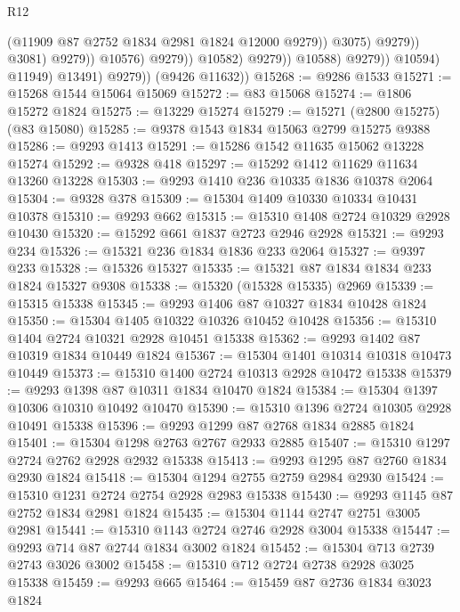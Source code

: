 \begin{lexlean}{R12}
\begin{coremodule}
                                                (@11909 @87 @2752 @1834 @2981 @1824 @12000 @9279))
                                              @3075)
                                            @9279))
                                        @3081)
                                      @9279))
                                  @10576)
                                @9279))
                            @10582)
                          @9279))
                      @10588)
                    @9279))
                @10594)
              @11949)
            @13491)
          @9279))
      (@9426 @11632))
@15268 := @9286 @1533
@15271 := @15268 @1544 @15064 @15069
@15272 := @83 @15068
@15274 := @1806 @15272 @1824
@15275 := @13229 @15274
@15279 := @15271 (@2800 @15275) (@83 @15080)
@15285 := @9378 @1543 @1834 @15063 @2799 @15275 @9388
@15286 := @9293 @1413
@15291 := @15286 @1542 @11635 @15062 @13228 @15274
@15292 := @9328 @418
@15297 := @15292 @1412 @11629 @11634 @13260 @13228
@15303 := @9293 @1410 @236 @10335 @1836 @10378 @2064
@15304 := @9328 @378
@15309 := @15304 @1409 @10330 @10334 @10431 @10378
@15310 := @9293 @662
@15315 := @15310 @1408 @2724 @10329 @2928 @10430
@15320 := @15292 @661 @1837 @2723 @2946 @2928
@15321 := @9293 @234
@15326 := @15321 @236 @1834 @1836 @233 @2064
@15327 := @9397 @233
@15328 := @15326 @15327
@15335 := @15321 @87 @1834 @1834 @233 @1824 @15327 @9308
@15338 := @15320 (@15328 @15335) @2969
@15339 := @15315 @15338
@15345 := @9293 @1406 @87 @10327 @1834 @10428 @1824
@15350 := @15304 @1405 @10322 @10326 @10452 @10428
@15356 := @15310 @1404 @2724 @10321 @2928 @10451 @15338
@15362 := @9293 @1402 @87 @10319 @1834 @10449 @1824
@15367 := @15304 @1401 @10314 @10318 @10473 @10449
@15373 := @15310 @1400 @2724 @10313 @2928 @10472 @15338
@15379 := @9293 @1398 @87 @10311 @1834 @10470 @1824
@15384 := @15304 @1397 @10306 @10310 @10492 @10470
@15390 := @15310 @1396 @2724 @10305 @2928 @10491 @15338
@15396 := @9293 @1299 @87 @2768 @1834 @2885 @1824
@15401 := @15304 @1298 @2763 @2767 @2933 @2885
@15407 := @15310 @1297 @2724 @2762 @2928 @2932 @15338
@15413 := @9293 @1295 @87 @2760 @1834 @2930 @1824
@15418 := @15304 @1294 @2755 @2759 @2984 @2930
@15424 := @15310 @1231 @2724 @2754 @2928 @2983 @15338
@15430 := @9293 @1145 @87 @2752 @1834 @2981 @1824
@15435 := @15304 @1144 @2747 @2751 @3005 @2981
@15441 := @15310 @1143 @2724 @2746 @2928 @3004 @15338
@15447 := @9293 @714 @87 @2744 @1834 @3002 @1824
@15452 := @15304 @713 @2739 @2743 @3026 @3002
@15458 := @15310 @712 @2724 @2738 @2928 @3025 @15338
@15459 := @9293 @665
@15464 := @15459 @87 @2736 @1834 @3023 @1824

\end{coremodule}
\end{lexlean}

